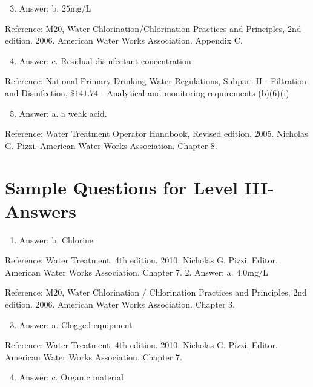 \documentclass[10pt]{article}
\begin{document}
\begin{enumerate}
  \setcounter{enumi}{2}
  \item Answer: b. $25 \mathrm{mg} / \mathrm{L}$
\end{enumerate}

Reference: M20, Water Chlorination/Chlorination Practices and Principles, 2nd edition. 2006. American Water Works Association. Appendix C.

\begin{enumerate}
  \setcounter{enumi}{3}
  \item Answer: c. Residual disinfectant concentration
\end{enumerate}

Reference: National Primary Drinking Water Regulations, Subpart H - Filtration and Disinfection, $\$ 141.74$ - Analytical and monitoring requirements (b)(6)(i)

\begin{enumerate}
  \setcounter{enumi}{4}
  \item Answer: a. a weak acid.
\end{enumerate}

Reference: Water Treatment Operator Handbook, Revised edition. 2005. Nicholas G. Pizzi. American Water Works Association. Chapter 8.

\section{Sample Questions for Level III-Answers}
\begin{enumerate}
  \item Answer: b. Chlorine
\end{enumerate}

Reference: Water Treatment, 4th edition. 2010. Nicholas G. Pizzi, Editor. American Water Works Association. Chapter 7. 2. Answer: a. $4.0 \mathrm{mg} / \mathrm{L}$

Reference: M20, Water Chlorination / Chlorination Practices and Principles, 2nd edition. 2006. American Water Works Association. Chapter 3.

\begin{enumerate}
  \setcounter{enumi}{2}
  \item Answer: a. Clogged equipment
\end{enumerate}

Reference: Water Treatment, 4th edition. 2010. Nicholas G. Pizzi, Editor. American Water Works Association. Chapter 7.

\begin{enumerate}
  \setcounter{enumi}{3}
  \item Answer: c. Organic material
\end{enumerate}
\end{document}

